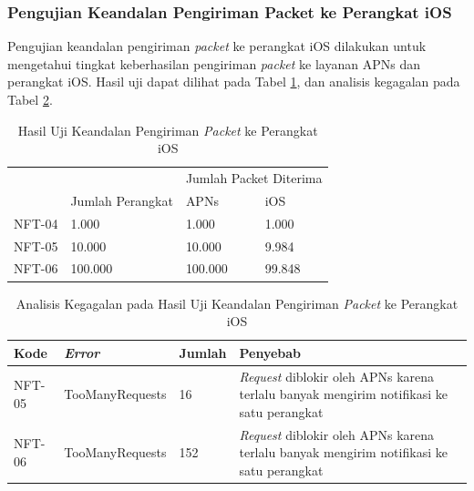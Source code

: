 \subsubsection{Pengujian Keandalan Pengiriman Packet ke Perangkat iOS}
\par Pengujian keandalan pengiriman \textit{packet} ke perangkat iOS dilakukan untuk mengetahui tingkat keberhasilan pengiriman \textit{packet} ke layanan APNs dan perangkat iOS. Hasil uji dapat dilihat pada Tabel \ref{t:keandalan_ios}, dan analisis kegagalan pada Tabel \ref{t:analisis_ios}.
\begin{longtable}{|p{1.3cm}|p{3cm}|p{2cm}|p{2cm}|}
	\caption{Hasil Uji Keandalan Pengiriman \textit{Packet} ke Perangkat iOS} \label{t:keandalan_ios} \\ \hline
	\rowcolor{lightgray} &  & \multicolumn{2}{c|}{Jumlah Packet Diterima} \\ \hhline{~|~|*2{-}|}
	\rowcolor{lightgray} \multirow{-2}{*}{Kode} & \multirow{-2}{*}{Jumlah Perangkat} & APNs & iOS \\ \hline
	NFT-04 & 1.000 & 1.000 & 1.000 \\ \hline
	NFT-05 & 10.000 & 10.000 & 9.984 \\ \hline
	NFT-06 & 100.000 & 100.000 & 99.848 \\ \hline
\end{longtable}
\begin{longtable}{|p{1.3cm}|p{3cm}|p{1cm}|p{3cm}|}
	\caption{Analisis Kegagalan pada Hasil Uji Keandalan Pengiriman \textit{Packet} ke Perangkat iOS} \label{t:analisis_ios} \\ \hline
	\rowcolor{lightgray} Kode & \textit{Error} & Jumlah & Penyebab \\ \hline
	NFT-05 & TooManyRequests & 16 & \textit{Request} diblokir oleh APNs karena terlalu banyak mengirim notifikasi ke satu perangkat \\ \hline
	NFT-06 & TooManyRequests & 152 & \textit{Request} diblokir oleh APNs karena terlalu banyak mengirim notifikasi ke satu perangkat \\ \hline
\end{longtable}

